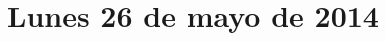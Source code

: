\documentclass[12pt,spanish]{article}
\begin{document}
  \thispagestyle{empty}
  \pagestyle{empty}
  \section*{Lunes 26 de mayo de 2014}

  \noindent
  
\end{document}
